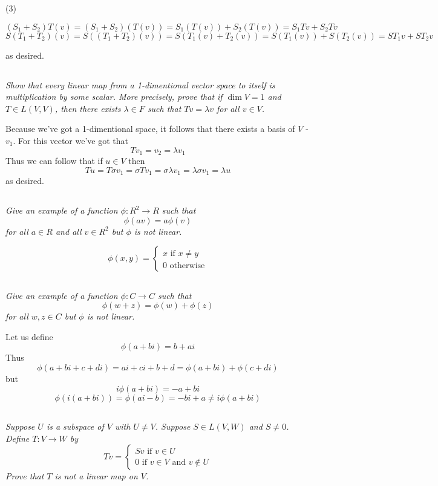 \documentclass[11pt,oneside,titlepage]{book}
\begin{document}
(3)

$$(S_1 + S_2)T(v) = (S_1 + S_2)(T(v)) = S_1(T(v)) + S_2(T(v)) = S_1 T v + S_2 T v$$
$$S(T_1 + T_2)(v) = S((T_1 + T_2)(v)) = S(T_1(v) + T_2(v)) = S(T_1(v)) + S(T_2(v)) = S T_1 v +
S T_2 v$$

as desired.

\subsection{}
\textit{Show that every linear map from a 1-dimentional vector space to itself is
  multiplication by some scalar. More precisely, prove that if $\dim V = 1$ and
  $T \in L(V, V)$, then there exists $\lambda \in F$ such that $Tv = \lambda v$ for
  all $v \in V$.}

Because we've got a 1-dimentional space, it follows that there exists a basis of $V$ - $v_1$.
For this vector we've got that
$$T v_1 = v_2 = \lambda v_1$$
Thus we can follow that if $u \in V$ then
$$T u = T \sigma v_1 =  \sigma T v_1 = \sigma \lambda v_1 = \lambda \sigma v_1 = \lambda u$$
as desired.

\subsection{}
\textit{Give an example of a function $\phi: R^2 \to R$ such that }
$$\phi (av) = a\phi(v)$$
\textit{for all $a \in R$ and all $v \in R^2$ but $\phi$ is not linear.}

$$\phi(x, y) =
\begin{cases}
  x \text{ if } x \neq y \\
  0 \text{ otherwise}
\end{cases}
$$

\subsection{}
\textit{Give an example of a function $\phi: C \to C$ such that }
$$\phi (w + z) = \phi(w) + \phi(z)$$
\textit{for all $w, z \in C$ but $\phi$ is not linear.}

Let us define 
$$\phi(a + bi) = b + ai$$
Thus 
$$\phi(a + bi + c + di) = ai + ci + b + d = \phi(a + bi) + \phi(c + di)$$
but
$$i \phi(a + bi) = -a + bi$$
$$\phi(i(a + bi)) = \phi(ai - b) = -bi + a \neq i \phi(a + bi)$$

\subsection{}
\textit{Suppose $U$ is a subspace of $V$ with $U \neq V$. Suppose $S \in L(V, W)$ and
  $S \neq 0$. Define $T: V \to W$ by}
$$Tv =
\begin{cases}
  Sv \text{ if } v \in U \\
  0 \text{ if } v \in V \text{ and } v \notin U
\end{cases}
$$
\textit{Prove that $T$ is not a linear map on $V$.}
\end{document}
